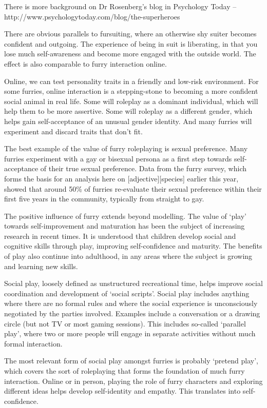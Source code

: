 There is more background on Dr Rosenberg's blog in Psychology Today – http://www.psychologytoday.com/blog/the-superheroes

There are obvious parallels to fursuiting, where an otherwise shy suiter becomes confident and outgoing. The experience of being in suit is liberating, in that you lose much self-awareness and become more engaged with the outside world. The effect is also comparable to furry interaction online.

Online, we can test personality traits in a friendly and low-risk environment. For some furries, online interaction is a stepping-stone to becoming a more confident social animal in real life. Some will roleplay as a dominant individual, which will help them to be more assertive. Some will roleplay as a different gender, which helps gain self-acceptance of an unusual gender identity. And many furries will experiment and discard traits that don't fit.

The best example of the value of furry roleplaying is sexual preference. Many furries experiment with a gay or bisexual persona as a first step towards self-acceptance of their true sexual preference. Data from the furry survey, which forms the basis for an analysis here on [adjective][species] earlier this year, showed that around 50\% of furries re-evaluate their sexual preference within their first five years in the community, typically from straight to gay.

The positive influence of furry extends beyond modelling. The value of `play' towards self-improvement and maturation has been the subject of increasing research in recent times. It is understood that children develop social and cognitive skills through play, improving self-confidence and maturity. The benefits of play also continue into adulthood, in any areas where the subject is growing and learning new skills.

Social play, loosely defined as unstructured recreational time, helps improve social coordination and development of `social scripts'. Social play includes anything where there are no formal rules and where the social experience is unconsciously negotiated by the parties involved. Examples include a conversation or a drawing circle (but not TV or most gaming sessions). This includes so-called `parallel play', where two or more people will engage in separate activities without much formal interaction.

The most relevant form of social play amongst furries is probably `pretend play', which covers the sort of roleplaying that forms the foundation of much furry interaction. Online or in person, playing the role of furry characters and exploring different ideas helps develop self-identity and empathy. This translates into self-confidence.

